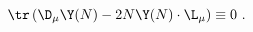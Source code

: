 \begin{equation}
  \label{eq:trid}
  \tr\left(\D_\mu \Y(N) - 2N\Y(N)\cdot\L_\mu\right) \equiv 0 \ .
\end{equation}

